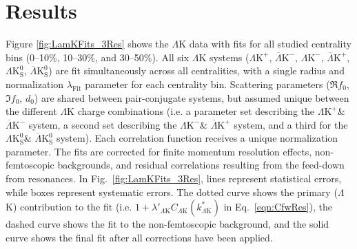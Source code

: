 \documentclass[ALICE,manyauthors]{cernphprep}
\newcommand{\LamK}{$\Lambda$K\xspace}
\newcommand{\LamKchP}{$\Lambda\mathrm{K^{+}}$\xspace}
\newcommand{\ALamKchM}{$\overline{\Lambda}\mathrm{K^{-}}$\xspace}
\newcommand{\LamKchM}{$\Lambda\mathrm{K^{-}}$\xspace}
\newcommand{\ALamKchP}{$\overline{\Lambda}\mathrm{K^{+}}$\xspace}
\newcommand{\LamKs}{$\Lambda\mathrm{K^{0}_{S}}$\xspace}
\newcommand{\ALamKs}{$\overline{\Lambda}\mathrm{K^{0}_{S}}$\xspace}
\begin{document}
\section{Results}
\label{sec:Results}

Figure \ref{fig:LamKFits_3Res} shows the \LamK data with fits for all studied centrality bins (0--10\%, 10--30\%, and 30--50\%). 
All six \LamK systems (\LamKchP, \ALamKchM, \LamKchM, \ALamKchP, \LamKs, \ALamKs) are fit simultaneously across all centralities, with a single radius and normalization $\lambda_{\mathrm{Fit}}$ parameter for each centrality bin.
Scattering parameters ($\Re f_{0}$, $\Im f_{0}$, $d_{0}$) are shared between pair-conjugate systems, but assumed unique between the different \LamK charge combinations (i.e. a parameter set describing the \LamKchP \& \ALamKchM system, a second set describing the \LamKchM \& \ALamKchP system, and a third for the \LamKs \& \ALamKs system).
Each correlation function receives a unique normalization parameter.
The fits are corrected for finite momentum resolution effects, non-femtoscopic backgrounds, and residual correlations resulting from the feed-down from resonances.
In Fig.\ \ref{fig:LamKFits_3Res}, lines represent statistical errors, while boxes represent systematic errors.  
The dotted curve shows the primary (\LamK) contribution to the fit (i.e. $1 + \lambda'_{\Lambda\mathrm{K}}C_{\Lambda\mathrm{K}}(k^{*}_{\Lambda\mathrm{K}})$ in Eq.\ \ref{eqn:CfwRes}), the dashed curve shows the fit to the non-femtoscopic background, and the solid curve shows the final fit after all corrections have been applied.
\end{document}
